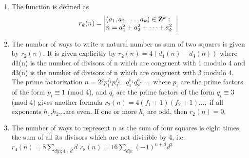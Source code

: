 \begin{enumerate}[resume]
    \item The function is defined as
          \[
              r_k(n)
              =
              \left|
              \begin{array}{@{}l}
                  (a_1,a_2,\dots,a_k) \in \mathbf{Z}^k : \\
                  n = a_1^2 + a_2^2 + \dots + a_k^2
              \end{array}
              \right|
          \]
    \item The number of ways to write a natural number as sum of two squares is given by $r_2(n)$. It is given explicitly by
          $r_{2}\left(n\right) = 4\left(d_{1}\left(n\right) - d_{3}\left(n\right)\right)$
          where d1(n) is the number of divisors of n which are congruent with 1 modulo 4 and d3(n) is the number of divisors of n which are congruent with 3 modulo 4.
          The prime factorization $n = 2^{g}p_{1}^{f_{1}}p_{2}^{f_{2}}. . .q_{1}^{h_{1}}q_{2}^{h_{2}}. . . ,$ where $\displaystyle p_{i}$ are the prime factors of the form $\displaystyle p_{i} \equiv 1$ (mod 4), and $q_{i}$ are the prime factors of the form $q_{i} \equiv 3$ (mod 4) gives another formula $r_{2}\left(n\right) = 4\left(f_{1}+1\right)\left(f_{2}+1\right)\dots,$ if all exponents $h_{1}$,$h_{2}$,\dots are even. If one or more $h_{i}$ are odd, then $r_{2}\left(n\right) = 0.$
    \item The number of ways to represent n as the sum of four squares is eight times the sum of all its divisors which are not divisible by 4, i.e.
          $r_{4}\left( n \right) = 8 \displaystyle\sum _{d| n;4 \nmid d}d$
          $r_{8}\left(n\right) = 16 \displaystyle\sum _{d|n} \left(-1\right)^{n+d}d^{3}$
\end{enumerate}


